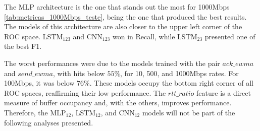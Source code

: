 \documentclass[a4paper,fleqn]{cas-sc}
\begin{document}
The MLP architecture is the one that stands out the most for 1000Mbps \ref{tab:metricas_1000Mbps_teste}, being the one that produced the best results. The models of this architecture are also closer to the upper left corner of the ROC space. LSTM$_{123}$ and CNN$_{123}$ won in Recall, while LSTM$_{23}$ presented one of the best F1.

The worst performances were due to the models trained with the pair $ack\_ewma$ and $send\_ewma$, with hits below $55\%$, for 10, 500, and 1000Mbps rates. For 100Mbps, it was below $76\%$. These models occupy the bottom right corner of all ROC spaces, reaffirming their low performance. The $rtt\_ratio$ feature is a direct measure of buffer occupancy and, with the others, improves performance. Therefore, the MLP$_{12}$, LSTM$_{12}$, and CNN$_{12}$ models will not be part of the following analyses presented.
 
\end{document}
